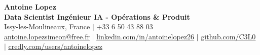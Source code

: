 \documentclass[letterpaper,10pt]{article}
\begin{document}
\begin{center}
    {\Huge \textbf{Antoine Lopez}} \\ \vspace{2pt}
    {\large \textbf{Data Scientist Ingénieur IA - Opérations \& Produit}} \\ \vspace{3pt}
    \small
    Issy-les-Moulineaux, France $|$ +33 6 50 43 88 03 \\
    \href{mailto:antoine.lopezsimeon@free.fr}{\underline{antoine.lopezsimeon@free.fr}} $|$ 
    \href{https://linkedin.com/in/antoinelopez26}{\underline{linkedin.com/in/antoinelopez26}} $|$
    \href{https://github.com/C3L0}{\underline{github.com/C3L0}} $|$
    \href{https://www.credly.com/users/antoinelopez26}{\underline{credly.com/users/antoinelopez}}
\end{center}

\vspace{-10pt}







\end{document}

